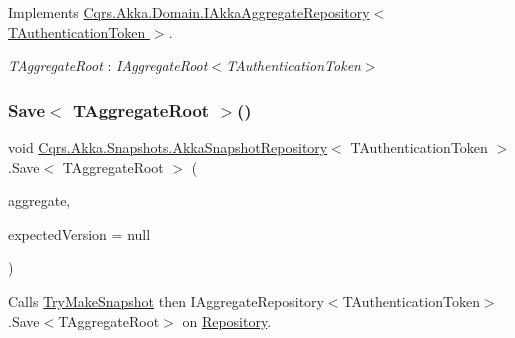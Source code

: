 Implements \hyperlink{interfaceCqrs_1_1Akka_1_1Domain_1_1IAkkaAggregateRepository_a9010b259daf5d09f7269277361015ddf_a9010b259daf5d09f7269277361015ddf}{Cqrs.\+Akka.\+Domain.\+I\+Akka\+Aggregate\+Repository$<$ T\+Authentication\+Token $>$}.

\begin{Desc}
\item[Type Constraints]\begin{description}
\item[{\em T\+Aggregate\+Root} : {\em I\+Aggregate\+Root$<$T\+Authentication\+Token$>$}]\end{description}
\end{Desc}
\mbox{\label{classCqrs_1_1Akka_1_1Snapshots_1_1AkkaSnapshotRepository_adf399a4ea283ae725bf8f1229d6da30a_adf399a4ea283ae725bf8f1229d6da30a}} 
\subsubsection{\texorpdfstring{Save$<$ T\+Aggregate\+Root $>$()}{Save< TAggregateRoot >()}}
{\footnotesize\ttfamily void \hyperlink{classCqrs_1_1Akka_1_1Snapshots_1_1AkkaSnapshotRepository}{Cqrs.\+Akka.\+Snapshots.\+Akka\+Snapshot\+Repository}$<$ T\+Authentication\+Token $>$.Save$<$ T\+Aggregate\+Root $>$ (\begin{DoxyParamCaption}\item[{T\+Aggregate\+Root}]{aggregate,  }\item[{int?}]{expected\+Version = {\ttfamily null} }\end{DoxyParamCaption})}



Calls \hyperlink{classCqrs_1_1Akka_1_1Snapshots_1_1AkkaSnapshotRepository_ae9df38e7f69f1cae3c080fcf8a998a18_ae9df38e7f69f1cae3c080fcf8a998a18}{Try\+Make\+Snapshot} then I\+Aggregate\+Repository$<$\+T\+Authentication\+Token$>$.\+Save$<$\+T\+Aggregate\+Root$>$ on \hyperlink{classCqrs_1_1Akka_1_1Snapshots_1_1AkkaSnapshotRepository_a4961f1b8481f1205c143172185bae3bb_a4961f1b8481f1205c143172185bae3bb}{Repository}. 


